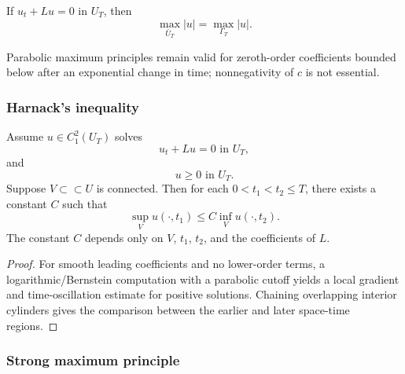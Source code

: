 \begin{remark}
\label{rem:parabolic-weak-max-principle-abs-value}

If $u_t+Lu=0$ in $U_T$, then
\[
\max_{\bar U_T}|u|=\max_{\Gamma_T}|u|.
\]
\end{remark}

\begin{remark}
\label{rem:parabolic-max-principle-negative-c}

Parabolic maximum principles remain valid for zeroth-order coefficients bounded below after an exponential change in time; nonnegativity of $c$ is not essential.
\end{remark}

\subsubsection{Harnack's inequality}

\begin{theorem}
\label{thm:parabolic-harnack-inequality}

Assume $u \in C^2_1(U_T)$ solves
\[
u_t + Lu = 0 \text{ in } U_T,
\tag{68}
\]
and
\[
u \geq 0 \text{ in } U_T.
\]
Suppose $V \subset\subset U$ is connected. Then for each $0 < t_1 < t_2 \leq T$, there exists a constant $C$ such that
\[
\sup_V u(\cdot, t_1) \leq C \inf_V u(\cdot, t_2).
\tag{69}
\]
The constant $C$ depends only on $V$, $t_1$, $t_2$, and the coefficients of $L$.
\end{theorem}

\begin{proof}
\sketch For smooth leading coefficients and no lower-order terms, a logarithmic/Bernstein computation with a parabolic cutoff yields a local gradient and time-oscillation estimate for positive solutions. Chaining overlapping interior cylinders gives the comparison between the earlier and later space-time regions.
\end{proof}

\subsubsection{Strong maximum principle}

